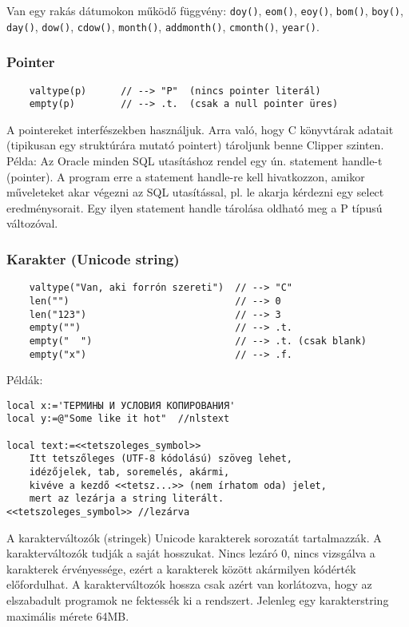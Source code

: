 Van egy rakás dátumokon működő függvény:
\verb!doy()!,
\verb!eom()!,
\verb!eoy()!,
\verb!bom()!,
\verb!boy()!,
\verb!day()!,
\verb!dow()!,
\verb!cdow()!,
\verb!month()!,
\verb!addmonth()!,
\verb!cmonth()!,
\verb!year()!.


\subsubsection{Pointer}

\begin{verbatim}
    valtype(p)      // --> "P"  (nincs pointer literál)
    empty(p)        // --> .t.  (csak a null pointer üres)
\end{verbatim}

A pointereket interfészekben használjuk. Arra való, hogy C könyvtárak
adatait (tipikusan egy struktúrára mutató pointert) tároljunk benne Clipper szinten.
Példa: Az Oracle minden SQL utasításhoz rendel egy ún. statement handle-t (pointer).
A program erre a statement handle-re kell hivatkozzon, amikor műveleteket
akar végezni az SQL utasítással, pl.  le akarja kérdezni egy select
eredménysorait. Egy ilyen statement handle tárolása oldható meg a P típusú
változóval.


\subsubsection{Karakter (Unicode string)}
\begin{verbatim}
    valtype("Van, aki forrón szereti")  // --> "C"
    len("")                             // --> 0
    len("123")                          // --> 3
    empty("")                           // --> .t.
    empty("  ")                         // --> .t. (csak blank)
    empty("x")                          // --> .f.
\end{verbatim}

Példák:
\begin{verbatim}
local x:='ТЕРМИНЫ И УСЛОВИЯ КОПИРОВАНИЯ'
local y:=@"Some like it hot"  //nlstext

local text:=<<tetszoleges_symbol>>
    Itt tetszőleges (UTF-8 kódolású) szöveg lehet,
    idézőjelek, tab, soremelés, akármi,
    kivéve a kezdő <<tetsz...>> (nem írhatom oda) jelet,
    mert az lezárja a string literált.
<<tetszoleges_symbol>> //lezárva
\end{verbatim}


A karakterváltozók (stringek) Unicode karakterek sorozatát tartalmazzák.
A karakterváltozók tudják a saját hosszukat. Nincs lezáró 0, nincs vizsgálva 
a karakterek érvényessége, ezért a karakterek között akármilyen kódérték 
előfordulhat. A karakterváltozók hossza csak azért van korlátozva, hogy az 
elszabadult programok ne fektessék ki a rendszert. Jelenleg egy karakterstring 
maximális mérete 64MB. 

